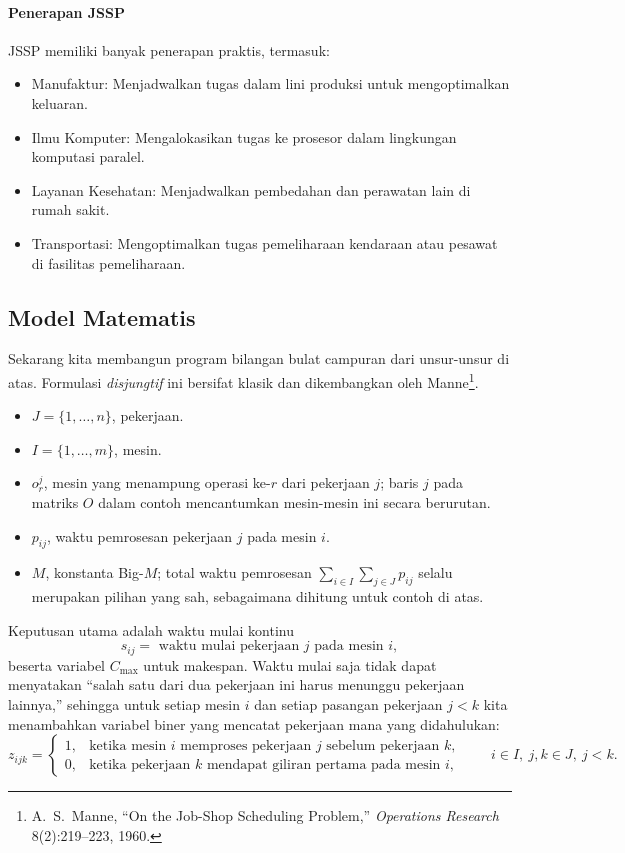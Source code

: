 \paragraph{Penerapan JSSP}
JSSP memiliki banyak penerapan praktis, termasuk:
\begin{itemize}
  \item Manufaktur: Menjadwalkan tugas dalam lini produksi untuk mengoptimalkan keluaran.
  \item Ilmu Komputer: Mengalokasikan tugas ke prosesor dalam lingkungan komputasi paralel.
  \item Layanan Kesehatan: Menjadwalkan pembedahan dan perawatan lain di rumah sakit.
  \item Transportasi: Mengoptimalkan tugas pemeliharaan kendaraan atau pesawat di fasilitas pemeliharaan.
\end{itemize}


\subsection{Model Matematis}

Sekarang kita membangun program bilangan bulat campuran dari unsur-unsur di atas.
Formulasi \emph{disjungtif} ini bersifat klasik dan dikembangkan oleh Manne\footnote{A.~S.~Manne, ``On the Job-Shop Scheduling Problem,'' \emph{Operations Research} 8(2):219--223, 1960.}.

\begin{itemize}
  \item $J = \{1, \ldots, n\}$, pekerjaan.
  \item $I = \{1, \ldots, m\}$, mesin.
\end{itemize}
\begin{itemize}
  \item $o_r^j$, mesin yang menampung operasi ke-$r$ dari pekerjaan $j$; baris $j$ pada matriks $O$ dalam contoh mencantumkan mesin-mesin ini secara berurutan.
  \item $p_{ij}$, waktu pemrosesan pekerjaan $j$ pada mesin $i$.
  \item $M$, konstanta Big-$M$; total waktu pemrosesan $\sum_{i \in I} \sum_{j \in J} p_{ij}$ selalu merupakan pilihan yang sah, sebagaimana dihitung untuk contoh di atas.
\end{itemize}
Keputusan utama adalah waktu mulai kontinu
$$
s_{ij} = \text{ waktu mulai pekerjaan $j$ pada mesin $i$},
$$
beserta variabel $C_{\max}$ untuk makespan.
Waktu mulai saja tidak dapat menyatakan ``salah satu dari dua pekerjaan ini harus menunggu pekerjaan lainnya,'' sehingga untuk setiap mesin $i$ dan setiap pasangan pekerjaan $j < k$ kita menambahkan variabel biner yang mencatat pekerjaan mana yang didahulukan:
$$
z_{ijk} = \begin{cases} 1, & \text{ketika mesin } i \text{ memproses pekerjaan } j \text{ sebelum pekerjaan } k,\\ 0, & \text{ketika pekerjaan } k \text{ mendapat giliran pertama pada mesin } i\text{,} \end{cases}
\qquad i \in I, \ j,k \in J, \ j < k.
$$

